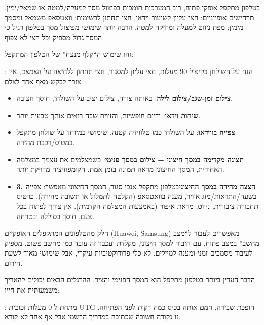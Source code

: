 
בטלפון מתקפל אופקי פתוח, רוב המערכות תומכות בפיצול מסך למעלה/למטה או שמאל/ימין. תרחישים אופייניים: חצי עליון לשיעור וידאו, חצי תחתון לרשימות; וואטסאפ משמאל ומסמך מימין; מפת ניווט למעלה ומוזיקה למטה. הרבה יותר שימושי מפיצול מסך בטלפון רגיל כי המסך גדול מספיק וכל חצי לא צפוף.


זהו שימוש ה“קלף מנצח” של הטלפון המתקפל:


: הנח על השולחן בקיפול 90 מעלות, חצי עליון למסגור, חצי תחתון ללחיצה על הצמצם, אין צורך לבקש מאף אחד לצלם.

\begin{itemize}
  \item \textbf{צילום זמן-שגב/צילום לילה}: באותה צורה, צילום יציב על השולחן, חוסך חצובה.
  \item \textbf{שיחות וידאו}: ידיים חופשיות, והזווית שבה רואים אותך טבעית יותר.
  \item \textbf{צפייה בווידאו}: על השולחן כמו טלוויזיה קטנה, שימושי במיוחד על שולחן מתקפל במטוס/רכבת מהירה.
  \item \textbf{תצוגה מקדימה במסך חיצוני + צילום במסך פנימי}: כשמצלמים את עצמך במצלמה האחורית, המסך החיצוני מראה תמונה בזמן אמת, הקומפוזיציה מדויקת יותר.
  \item \textbf{3. הצצה מהירה במסך החיצוני}בטלפון מתקפל אנכי סגור, המסך החיצוני מאפשר: צפייה בשעה/התראות/מזג אוויר, מענה בוואטסאפ (הקלטה לתמלול או תשובה מהירה), כרטיס תחבורה ציבורית, ניווט, מראת איפור (באמצעות המצלמה הקדמית). אין צורך לפתוח בכל פעם, חוסך בסוללה ובטרחה.
\end{itemize}


חלק מהטלפונים המתקפלים האופקיים (Huawei, Samsung) מאפשרים לעבור ל“מצב מחשב” במצב פתוח, עם חיבור למסך חיצוני, מקלדת ועכבר זה עובד כמו מחשב פשוט. מספיק לעיבוד מסמכים זמני ומענה למיילים. לא כלי פרודוקטיביות עיקרי, אבל שימושי מאוד לשעת חירום.


הדבר העדין ביותר בטלפון מתקפל הוא המסך הפנימי והציר. ההרגלים הבאים יכולים להאריך משמעותית את חייו:


: מתחת ל-0 מעלות זכוכית UTG הופכת שבירה, חמם אותה בכיס כמה דקות לפני הפתיחה. זו נקודה חשובה שכתובה במדריך הרשמי אבל אף אחד לא קורא.


